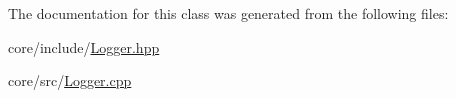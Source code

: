 The documentation for this class was generated from the following files\-:\begin{DoxyCompactItemize}
\item 
core/include/\hyperlink{_logger_8hpp}{Logger.\-hpp}\item 
core/src/\hyperlink{_logger_8cpp}{Logger.\-cpp}\end{DoxyCompactItemize}

